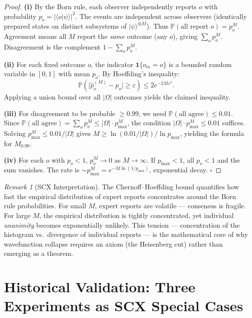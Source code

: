 \documentclass[11pt,a4paper]{article}
\newcommand{\ket}[1]{|#1\rangle}
\newcommand{\braket}[1]{\langle #1 \rangle}
\theoremstyle{definition}
\theoremstyle{remark}
\newtheorem{remark}[theorem]{Remark}
\newcommand{\Pbb}{\mathbb{P}}
\begin{document}
\begin{proof}
\textbf{(i)} By the Born rule, each observer independently reports $o$ with probability $p_o = |\braket{o|\psi}|^2$. The events are independent across observers (identically prepared states on distinct subsystems of $\ket{\psi}^{\otimes M}$). Thus $\Pbb(\text{all report } o) = p_o^M$. Agreement means all $M$ report the \emph{same} outcome (any $o$), giving $\sum_o p_o^M$. Disagreement is the complement $1 - \sum_o p_o^M$.

\textbf{(ii)} For each fixed outcome $o$, the indicator $\mathbf{1}\{o_m = o\}$ is a bounded random variable in $[0, 1]$ with mean $p_o$. By Hoeffding's inequality:
\[
\Pbb\!\left(\bigl|\hat{p}_o^{(M)} - p_o\bigr| \geq \varepsilon\right) \leq 2e^{-2M\varepsilon^2}.
\]
Applying a union bound over all $|\Omega|$ outcomes yields the claimed inequality.

\textbf{(iii)} For disagreement to be probable $\geq 0.99$, we need $\Pbb(\text{all agree}) \leq 0.01$. Since $\Pbb(\text{all agree}) = \sum_o p_o^M \leq |\Omega| \cdot p_{\max}^M$, the condition $|\Omega| \cdot p_{\max}^M \leq 0.01$ suffices. Solving $p_{\max}^M \leq 0.01/|\Omega|$ gives $M \geq \ln(0.01/|\Omega|) / \ln p_{\max}$, yielding the formula for $M_{0.99}$.

\textbf{(iv)} For each $o$ with $p_o < 1$, $p_o^M \to 0$ as $M \to \infty$. If $p_{\max} < 1$, all $p_o < 1$ and the sum vanishes. The rate is $\sim p_{\max}^M = e^{-M \ln(1/p_{\max})}$, exponential decay. $\square$
\end{proof}

\begin{remark}[SCX Interpretation]
The Chernoff--Hoeffding bound quantifies how fast the empirical distribution of expert reports concentrates around the Born rule probabilities. For small $M$, expert reports are volatile --- consensus is fragile. For large $M$, the empirical distribution is tightly concentrated, yet individual \emph{unanimity} becomes exponentially unlikely. This tension --- concentration of the histogram vs.\ divergence of individual reports --- is the mathematical core of why wavefunction collapse requires an axiom (the Heisenberg cut) rather than emerging as a theorem.
\end{remark}

\section{Historical Validation: Three Experiments as SCX Special Cases}
\end{document}
